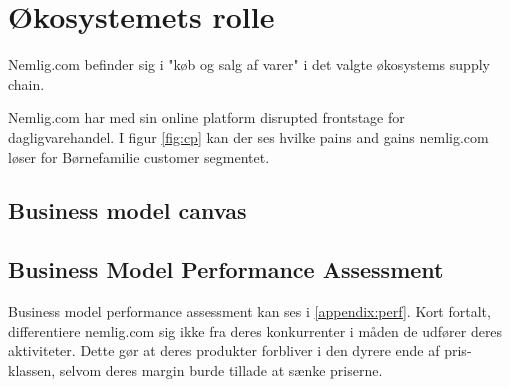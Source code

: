 \section{Økosystemets rolle}
Nemlig.com befinder sig i "køb og salg af varer" i det valgte økosystems supply chain.

Nemlig.com har med sin online platform disrupted frontstage for dagligvarehandel. I figur \ref{fig:cp} kan der ses hvilke pains and gains nemlig.com løser for Børnefamilie customer segmentet.

\subsection{Business model canvas}

\subsection{Business Model Performance Assessment}
Business model performance assessment kan ses i \autoref{appendix:perf}. Kort fortalt, differentiere nemlig.com sig ikke fra deres konkurrenter i måden de udfører deres aktiviteter. Dette gør at deres produkter forbliver i den dyrere ende af pris-klassen, selvom deres margin burde tillade at sænke priserne.

